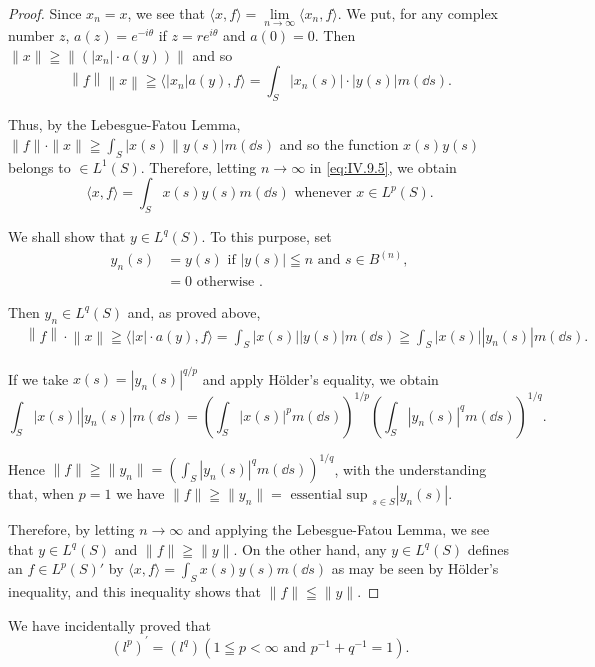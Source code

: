 \begin{proof}
Since \slim $x_{n} = x$, we see that $\langle x, f \rangle = \lim\limits_{n \to \infty} \langle x_{n}, f \rangle$. We put, for any complex number $z$, $a(z) = e^{-i\theta}$ if $z = r e^{i\theta}$ and $a(0) = 0$. Then $\|x\| \geqq \|(|x_{n}| \cdot a(y))\|$ and so 
\[
\left\| f \right\| \left\| x \right\| \geqq \langle \left| x _{n} \right| a (y), f \rangle = \int_{S} \left| x _{n} (s) \right| \cdot | y (s) | m (\dd s).
\]

Thus, by the Lebesgue-Fatou Lemma, $\|f\| \cdot \|x\| \geqq \int_{S} |x(s)\|y(s)| m(\dd s)$ and so the function $x(s)y(s)$ belongs to $\in L^{1}(S)$. Therefore, letting 
$n\to \infty$ in \eqref{eq:IV.9.5}, we obtain 
\[
\langle x, f \rangle = \int_{S} x (s) y (s) m (\dd s) \text{ whenever } x \in L ^{p} (S).
\]

We shall show that $y \in L^q(S)$. To this purpose, set 
\[
\begin{aligned} y _{n} (s) & = y (s) \text{ if } | y (s) | \leqq n \text{ and } s \in B ^{(n)}, \\ & = 0 \text{ otherwise }. \end{aligned}
\]

Then $y_{n} \in L^{q}(S)$ and, as proved above, 
\[
\begin{aligned}
&\left\| f \right\| \cdot \left\| x \right\|  \geqq \langle | x | \cdot a (y), f \rangle = \int_{S} | x (s) | | y (s) | m (\dd s) \geqq \int_{S} | x (s) | | y _{n} (s) | m (\dd s).
\end{aligned}
\]

If we take $x(s) = |y_n(s)|^{q/p}$ and apply Hölder's equality, we obtain 
\[
\int_{S} | x (s) | | y _{n} (s) | m (\dd s) = \left(\int_{S} | x (s) | ^{p} m (\dd s)\right) ^{1/p} \left(\int_{S} | y _{n} (s) | ^{q} m (\dd s)\right) ^{1/q}.
\]

Hence $\|f\| \geqq \|y_n\| = \left( \int_S |y_n(s)|^q m(\dd s) \right)^{1/q}$, with the understanding that, when $p = 1$ we have $\|f\| \geqq \|y_n\| = \text{ essential sup }_{s \in S} |y_n(s)|$. 

Therefore, by letting $n \to \infty$ and applying the Lebesgue-Fatou Lemma, we see that $y \in L^{q}(S)$ and $\| f \| \geqq \| y \|$. On the other hand, any $y \in L^{q}(S)$ defines an $f \in L^{p}(S)'$ by $\langle x, f \rangle = \int_{S} x(s) y(s) m(\dd s)$ as may be seen by Hölder's inequality, and this inequality shows that $\| f \| \leqq \| y \|$. 
\end{proof}

\begin{remarku} We have incidentally proved that 
\[
(l ^{p}) ^{\prime} = (l ^{q}) (1 \leqq p < \infty \text{ and } p ^{-1} + q ^{-1} = 1).
\]
\end{remarku}

